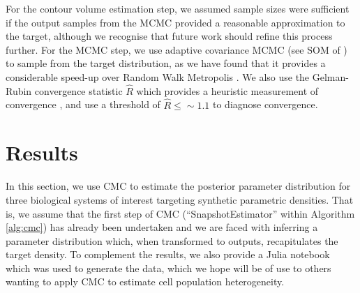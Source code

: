 \documentclass[10pt,letterpaper]{article}
\begin{document}
For the contour volume estimation step, we assumed sample sizes were sufficient if the output samples from the MCMC provided a reasonable approximation to the target, although we recognise that future work should refine this process further. For the MCMC step, we use adaptive covariance MCMC (see SOM of \cite{johnstone2016uncertainty}) to sample from the target distribution, as we have found that it provides a considerable speed-up over Random Walk Metropolis \cite{metropolis1953equation,lambert2018Student}. We also use the Gelman-Rubin convergence statistic $\hat{R}$ which provides a heuristic measurement of convergence \cite{lambert2018Student,gelman1992inference}, and use a threshold of $\hat{R}\leq\sim 1.1$ to diagnose convergence.


\section{Results}\label{sec:results}
In this section, we use CMC to estimate the posterior parameter distribution for three biological systems of interest targeting synthetic parametric densities. That is, we assume that the first step of CMC (``SnapshotEstimator'' within Algorithm \ref{alg:cmc}) has already been undertaken and we are faced with inferring a parameter distribution which, when transformed to outputs, recapitulates the target density. To complement the results, we also provide a Julia notebook which was used to generate the data, which we hope will be of use to others wanting to apply CMC to estimate cell population heterogeneity.
\end{document}
